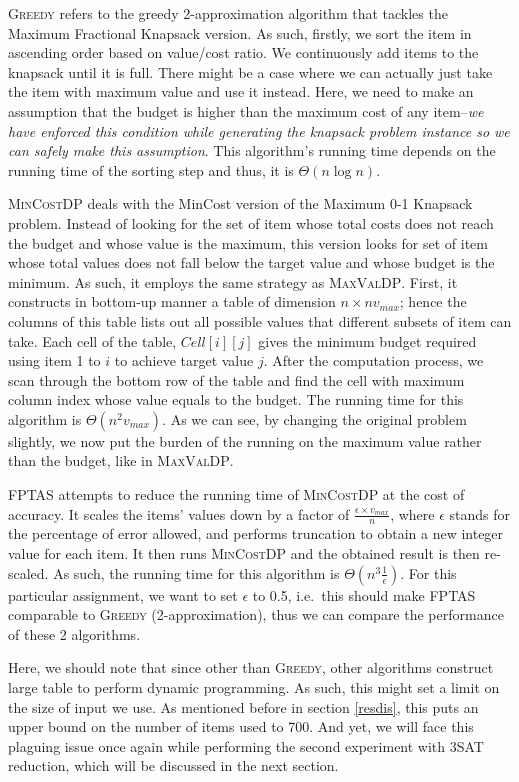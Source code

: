 \documentclass[12pt, oneside]{book}
\begin{document}
\textsc{Greedy} refers to the greedy 2-approximation algorithm that
tackles the Maximum Fractional Knapsack version. As such, firstly, we
sort the item in ascending order based on value/cost ratio. We
continuously add items to the knapsack until it is full. There might be
a case where we can actually just take the item with maximum value and
use it instead. Here, we need to make an assumption that the budget is
higher than the maximum cost of any item--\emph{we have enforced this
condition while generating the knapsack problem instance so we can
safely make this assumption}. This algorithm's running time depends on
the running time of the sorting step and thus, it is
\(\Theta(n\log{n})\).

\textsc{MinCostDP} deals with the MinCost version of the Maximum 0-1
Knapsack problem. Instead of looking for the set of item whose total
costs does not reach the budget and whose value is the maximum, this
version looks for set of item whose total values does not fall below the
target value and whose budget is the minimum. As such, it employs the
same strategy as \textsc{MaxValDP}. First, it constructs in bottom-up
manner a table of dimension \(n \times nv_{max}\); hence the columns of
this table lists out all possible values that different subsets of item
can take. Each cell of the table, \(Cell[i][j]\) gives the minimum
budget required using item 1 to \(i\) to achieve target value \(j\).
After the computation process, we scan through the bottom row of the
table and find the cell with maximum column index whose value equals to
the budget. The running time for this algorithm is
\(\Theta(n^2v_{max})\). As we can see, by changing the original problem
slightly, we now put the burden of the running on the maximum value
rather than the budget, like in \textsc{MaxValDP}.

\textsc{FPTAS} attempts to reduce the running time of \textsc{MinCostDP}
at the cost of accuracy. It scales the items' values down by a factor of
\(\frac{\epsilon \times v_{max}}{n}\), where \(\epsilon\) stands for the
percentage of error allowed, and performs truncation to obtain a new
integer value for each item. It then runs \textsc{MinCostDP} and the
obtained result is then re-scaled. As such, the running time for this
algorithm is \(\Theta(n^3\frac{1}{\epsilon})\). For this particular
assignment, we want to set \(\epsilon\) to 0.5, i.e.~this should make
\textsc{FPTAS} comparable to \textsc{Greedy} (2-approximation), thus we
can compare the performance of these 2 algorithms.

Here, we should note that since other than \textsc{Greedy}, other
algorithms construct large table to perform dynamic programming. As
such, this might set a limit on the size of input we use. As mentioned
before in section \ref{resdis}, this puts an upper bound on the number
of items used to 700. And yet, we will face this plaguing issue once
again while performing the second experiment with 3SAT reduction, which
will be discussed in the next section.
\end{document}
